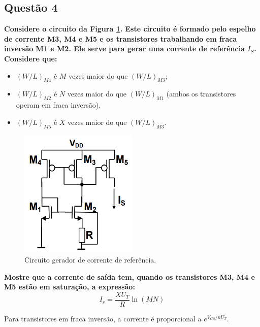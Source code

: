 \documentclass[12pt,a4paper]{article}
\begin{document}
\subsection*{Questão 4}
\begin{BoxQ}
    \textbf{Considere o circuito da Figura \ref{fig:gerador_corrente}. Este circuito é formado pelo espelho de corrente M3, M4 e M5 e os transistores trabalhando em fraca inversão M1 e M2. Ele serve para gerar uma corrente de referência $I_S$. Considere que:}
\end{BoxQ}\par
    \begin{itemize}
    \item $(W/L)_{M4}$ é $M$ vezes maior do que $(W/L)_{M3}$;
    \item $(W/L)_{M2}$ é $N$ vezes maior do que $(W/L)_{M1}$ (ambos os transistores operam em fraca inversão).
    \item $(W/L)_{M5}$ é $X$ vezes maior do que $(W/L)_{M3}$.
\end{itemize}

\begin{figure}[H]
    \centering
    \includegraphics[width=0.5\textwidth]{gerador_corrente_referencia.png}
    \caption{Circuito gerador de corrente de referência.}
    \label{fig:gerador_corrente}
\end{figure}

\textbf{Mostre que a corrente de saída tem, quando os transistores M3, M4 e M5 estão em saturação, a expressão:}
\begin{equation}
I_s = \frac{XU_T}{R} \ln(MN)
\end{equation}



Para transistores em fraca inversão, a corrente é proporcional a $e^{V_{GS}/nU_T}$. 
\end{document}
